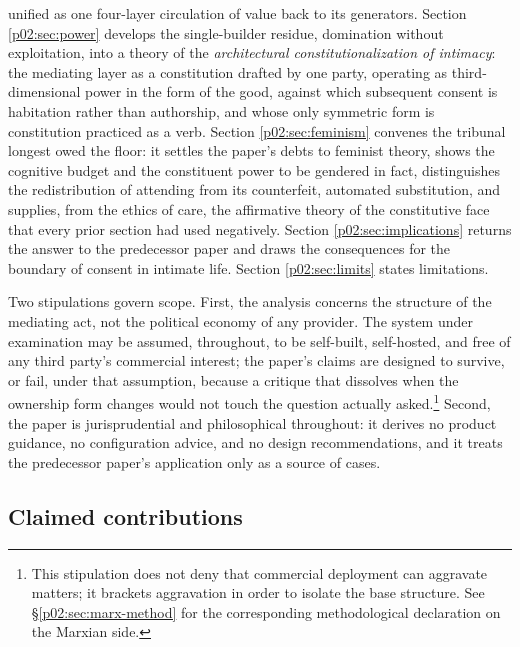 \documentclass[11pt,a4paper]{article}
\begin{document}
unified as one four-layer circulation of value back to its generators. Section \ref{p02:sec:power} develops the single-builder residue, domination without exploitation, into a theory of the \emph{architectural constitutionalization of intimacy}: the mediating layer as a constitution drafted by one party, operating as third-dimensional power in the form of the good, against which subsequent consent is habitation rather than authorship, and whose only symmetric form is constitution practiced as a verb. Section \ref{p02:sec:feminism} convenes the tribunal longest owed the floor: it settles the paper's debts to feminist theory, shows the cognitive budget and the constituent power to be gendered in fact, distinguishes the redistribution of attending from its counterfeit, automated substitution, and supplies, from the ethics of care, the affirmative theory of the constitutive face that every prior section had used negatively. Section \ref{p02:sec:implications} returns the answer to the predecessor paper and draws the consequences for the boundary of consent in intimate life. Section \ref{p02:sec:limits} states limitations.

Two stipulations govern scope. First, the analysis concerns the structure of the mediating act, not the political economy of any provider. The system under examination may be assumed, throughout, to be self-built, self-hosted, and free of any third party's commercial interest; the paper's claims are designed to survive, or fail, under that assumption, because a critique that dissolves when the ownership form changes would not touch the question actually asked.\footnote{This stipulation does not deny that commercial deployment can aggravate matters; it brackets aggravation in order to isolate the base structure. See \S\ref{p02:sec:marx-method} for the corresponding methodological declaration on the Marxian side.} Second, the paper is jurisprudential and philosophical throughout: it derives no product guidance, no configuration advice, and no design recommendations, and it treats the predecessor paper's application only as a source of cases.

\subsection{Claimed contributions}
\label{p02:sec:intro-contributions}
\end{document}
